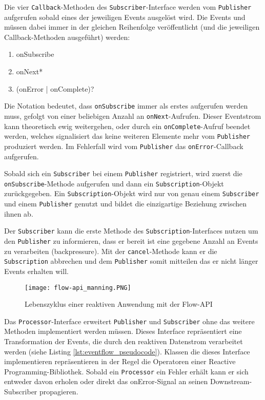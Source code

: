 Die vier \verb|Callback|-Methoden des \verb|Subscriber|-Interface werden vom \verb|Publisher| aufgerufen sobald eines der jeweiligen Events ausgelöst wird.
Die Events und müssen dabei immer in der gleichen Reihenfolge veröffentlicht (und die jeweiligen Callback-Methoden ausgeführt) werden:
\begin{enumerate}
	\item onSubscribe
	\item onNext*
	\item (onError | onComplete)?
\end{enumerate}
Die Notation bedeutet, dass \verb|onSubscribe| immer als erstes aufgerufen werden muss, gefolgt von einer beliebigen Anzahl an
\verb|onNext|-Aufrufen. Dieser Eventstrom kann theoretisch ewig weitergehen, oder durch ein \verb|onComplete|-Aufruf beendet werden, welches
signalisiert das keine weiteren Elemente mehr vom \verb|Publisher| produziert werden.
Im Fehlerfall wird vom \verb|Publisher| das \verb|onError|-Callback aufgerufen.

Sobald sich ein \verb|Subscriber| bei einem \verb|Publisher| registriert, wird zuerst die \verb|onSubscribe|-Methode aufgerufen und dann ein
\verb|Subscription|-Objekt zurückgegeben. Ein \verb|Subscription|-Objekt wird nur von genau einem \verb|Subscriber| und einem \verb|Publisher| genutzt
und bildet die einzigartige Beziehung zwischen ihnen ab.

Der \verb|Subscriber| kann die erste Methode des \verb|Subscription|-Interfaces nutzen um den \verb|Publisher| zu informieren, dass er bereit
ist eine gegebene Anzahl an Events zu verarbeiten (backpressure). Mit der \verb|cancel|-Methode kann er die \verb|Subscription| abbrechen und dem \verb|Publisher|
somit mitteilen das er nicht länger Events erhalten will.
\parencite{JavaSEFlow}

\begin{figure}[h!]
	\centering
	\texttt{[image: flow-api\_manning.PNG]}
	\caption{Lebenszyklus einer reaktiven Anwendung mit der Flow-API \parencite[Kapitel 17,  Figure 17.3]{JavaInAction}}
	\label{fig:flow-api}
\end{figure}

Das \verb|Processor|-Interface erweitert \verb|Publisher| und \verb|Subscriber| ohne das weitere Methoden implementiert werden müssen.
Dieses Interface repräsentiert eine Transformation der Events, die durch den
reaktiven Datenstrom verarbeitet werden (siehe Listing \ref{lst:eventflow_pseudocode}).
Klassen die dieses Interface implementieren repräsentieren in der Regel die Operatoren einer Reactive Programming-Bibliothek.
Sobald ein \verb|Processor| ein Fehler erhält kann er sich entweder davon erholen oder direkt das onError-Signal an seinen
Downstream-Subscriber propagieren.

